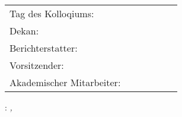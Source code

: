 \thispagestyle{empty}

\hfill
\vfill

\noindent
\begin{tabular}{ l | r}
 Tag des Kolloqiums: & \\
 Dekan: &  \\  
 Berichterstatter: & \\    
 Vorsitzender: & \\
	Akademischer Mitarbeiter:~~~~~~~~~&\\
\end{tabular}
\vspace{1cm}

\noindent\myName: \textit{\myTitle,}\\%
\textcopyright\ \myTime

%
%
%
%
%
